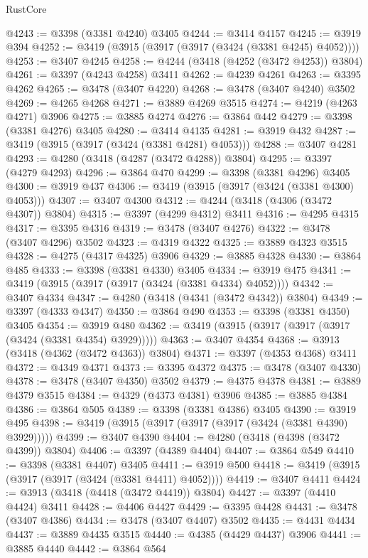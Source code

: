 \begin{lexlean}{RustCore}
\begin{coremodule}
@4243 := @3398 (@3381 @4240) @3405
@4244 := @3414 @4157
@4245 := @3919 @394
@4252 := @3419 (@3915 (@3917 (@3917 (@3424 (@3381 @4245) @4052))))
@4253 := @3407 @4245
@4258 := @4244 (@3418 (@4252 (@3472 @4253)) @3804)
@4261 := @3397 (@4243 @4258) @3411
@4262 := @4239 @4261
@4263 := @3395 @4262
@4265 := @3478 (@3407 @4220)
@4268 := @3478 (@3407 @4240) @3502
@4269 := @4265 @4268
@4271 := @3889 @4269 @3515
@4274 := @4219 (@4263 @4271) @3906
@4275 := @3885 @4274
@4276 := @3864 @442
@4279 := @3398 (@3381 @4276) @3405
@4280 := @3414 @4135
@4281 := @3919 @432
@4287 := @3419 (@3915 (@3917 (@3424 (@3381 @4281) @4053)))
@4288 := @3407 @4281
@4293 := @4280 (@3418 (@4287 (@3472 @4288)) @3804)
@4295 := @3397 (@4279 @4293)
@4296 := @3864 @470
@4299 := @3398 (@3381 @4296) @3405
@4300 := @3919 @437
@4306 := @3419 (@3915 (@3917 (@3424 (@3381 @4300) @4053)))
@4307 := @3407 @4300
@4312 := @4244 (@3418 (@4306 (@3472 @4307)) @3804)
@4315 := @3397 (@4299 @4312) @3411
@4316 := @4295 @4315
@4317 := @3395 @4316
@4319 := @3478 (@3407 @4276)
@4322 := @3478 (@3407 @4296) @3502
@4323 := @4319 @4322
@4325 := @3889 @4323 @3515
@4328 := @4275 (@4317 @4325) @3906
@4329 := @3885 @4328
@4330 := @3864 @485
@4333 := @3398 (@3381 @4330) @3405
@4334 := @3919 @475
@4341 := @3419 (@3915 (@3917 (@3917 (@3424 (@3381 @4334) @4052))))
@4342 := @3407 @4334
@4347 := @4280 (@3418 (@4341 (@3472 @4342)) @3804)
@4349 := @3397 (@4333 @4347)
@4350 := @3864 @490
@4353 := @3398 (@3381 @4350) @3405
@4354 := @3919 @480
@4362 := @3419 (@3915 (@3917 (@3917 (@3917 (@3424 (@3381 @4354) @3929)))))
@4363 := @3407 @4354
@4368 := @3913 (@3418 (@4362 (@3472 @4363)) @3804)
@4371 := @3397 (@4353 @4368) @3411
@4372 := @4349 @4371
@4373 := @3395 @4372
@4375 := @3478 (@3407 @4330)
@4378 := @3478 (@3407 @4350) @3502
@4379 := @4375 @4378
@4381 := @3889 @4379 @3515
@4384 := @4329 (@4373 @4381) @3906
@4385 := @3885 @4384
@4386 := @3864 @505
@4389 := @3398 (@3381 @4386) @3405
@4390 := @3919 @495
@4398 := @3419 (@3915 (@3917 (@3917 (@3917 (@3424 (@3381 @4390) @3929)))))
@4399 := @3407 @4390
@4404 := @4280 (@3418 (@4398 (@3472 @4399)) @3804)
@4406 := @3397 (@4389 @4404)
@4407 := @3864 @549
@4410 := @3398 (@3381 @4407) @3405
@4411 := @3919 @500
@4418 := @3419 (@3915 (@3917 (@3917 (@3424 (@3381 @4411) @4052))))
@4419 := @3407 @4411
@4424 := @3913 (@3418 (@4418 (@3472 @4419)) @3804)
@4427 := @3397 (@4410 @4424) @3411
@4428 := @4406 @4427
@4429 := @3395 @4428
@4431 := @3478 (@3407 @4386)
@4434 := @3478 (@3407 @4407) @3502
@4435 := @4431 @4434
@4437 := @3889 @4435 @3515
@4440 := @4385 (@4429 @4437) @3906
@4441 := @3885 @4440
@4442 := @3864 @564

\end{coremodule}
\end{lexlean}
